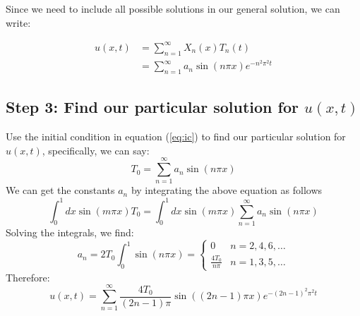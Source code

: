 \documentclass{article}
\begin{document}
Since we need to include all possible solutions in our general solution, we can write:

\begin{align}
  \label{eq:genSol}
  u(x,t) &= \sum_{n=1}^{\infty} X_n(x) T_n(t) \nonumber \\
   &= \sum_{n=1}^{\infty} a_n \sin(n\pi x) e^{-n^2\pi^2t}
\end{align}

\subsection{Step 3: Find our particular solution for $u(x,t)$}
Use the initial condition in equation (\ref{eq:ic}) to find our particular solution for
$u(x,t)$, specifically, we can say:
\[
  T_0 = \sum_{n=1}^{\infty} a_n \sin(n\pi x)
\]
We can get the constants $a_n$ by integrating the above equation as follows
\[
  \int_0^1 dx \sin(m\pi x) T_0 = 
  \int_0^1 dx \sin(m\pi x) \sum_{n=1}^{\infty} a_n \sin(n\pi x)
\]
Solving the integrals, we find:
\[
  a_n = 2T_0 \int_0^1 \sin(n\pi x) =
  \begin{cases}
    0 & n=2,4,6,\ldots \\
    \frac{4T_0}{n\pi} & n=1,3,5,\ldots
  \end{cases}
\]
Therefore:
\begin{equation}
  \label{eq:finalSoln}
  u(x,t) = \sum_{n=1}^{\infty} \frac{4T_0}{(2n-1)\pi}\sin\left((2n-1)\pi x\right) e^{-(2n-1)^2\pi^2t}  
\end{equation}
\end{document}
